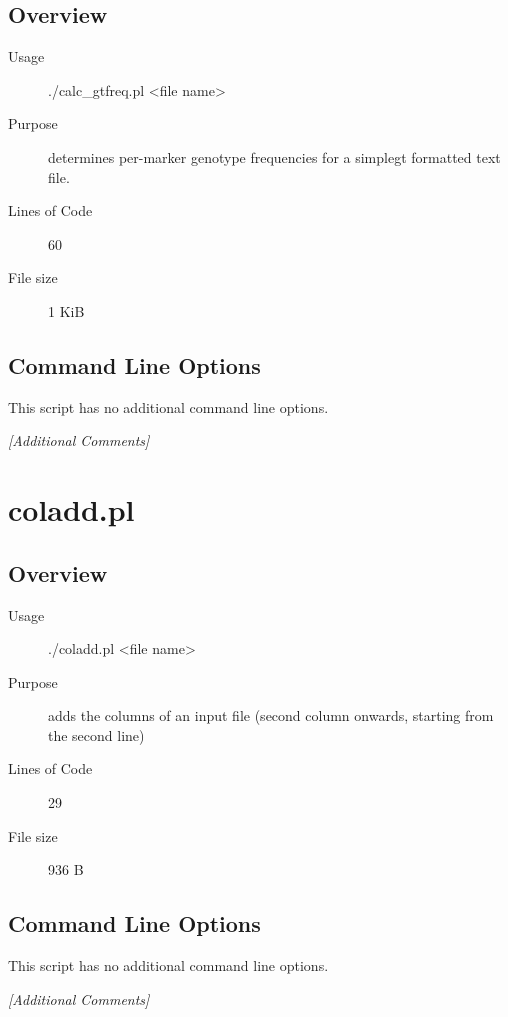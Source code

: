 \subsection{Overview}
\label{sec:calc-gtfreq.pl-overview}

\begin{description}
\item[Usage] ./calc_gtfreq.pl <file name>
\item[Purpose] determines per-marker genotype frequencies for a simplegt formatted text file.
\item[Lines of Code] 60
\item[File size] 1 KiB
\end{description}

\subsection{Command Line Options}
\label{sec:calc-gtfreq.pl-command-line}

This script has no additional command line options.

\emph{[Additional Comments]}

\section{coladd.pl}
\label{sec:coladd.pl}

\subsection{Overview}
\label{sec:coladd.pl-overview}

\begin{description}
\item[Usage] ./coladd.pl <file name>
\item[Purpose] adds the columns of an input file (second column onwards, starting from the second line)
\item[Lines of Code] 29
\item[File size] 936 B
\end{description}

\subsection{Command Line Options}
\label{sec:coladd.pl-command-line}

This script has no additional command line options.

\emph{[Additional Comments]}


